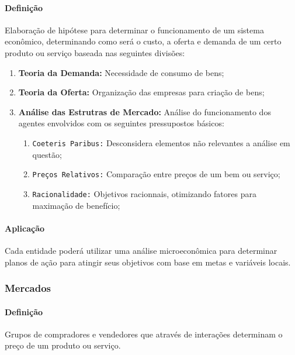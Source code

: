 \documentclass{article}
\begin{document}
            \paragraph{Definição}Elaboração de hipótese para determinar o funcionamento de um sistema econômico, determinando como será o custo, a oferta e demanda de um certo produto ou serviço baseada nas seguintes divisões:
                \begin{enumerate}[noitemsep, rightmargin = \leftmargin]
                    \item \textbf{Teoria da Demanda:} Necessidade de consumo de bens;

                    \item \textbf{Teoria da Oferta:} Organização das empresas para criação de bens;

                    \item \textbf{Análise das Estrutras de Mercado:} Análise do funcionamento dos agentes envolvidos com os seguintes pressupostos básicos:
                        \begin{enumerate}[noitemsep, rightmargin = \leftmargin]
                            \item \texttt{Coeteris Paribus:} Desconsidera elementos não relevantes a análise em questão; 
                            \item \texttt{Preços Relativos:} Comparação entre preços de um bem ou serviço;
                            \item \texttt{Racionalidade:} Objetivos racionnais, otimizando fatores para maximação de benefício;
                        \end{enumerate}
                \end{enumerate}

                \paragraph{Aplicação}Cada entidade poderá utilizar uma análise microeconômica para determinar planos de ação para atingir seus objetivos com base em metas e variáveis locais.

        \subsubsection{Mercados}
            \paragraph{Definição}Grupos de compradores e vendedores que através de interações determinam o preço de um produto ou serviço.
\end{document}

